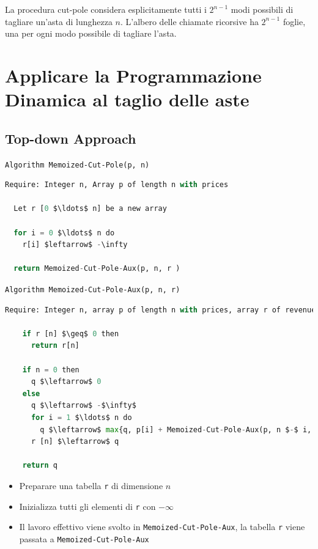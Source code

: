 La procedura cut-pole considera esplicitamente tutti i $2^{n-1}$ modi
possibili di tagliare un'asta di lunghezza $n$. L'albero delle
chiamate ricorsive ha $2^{n-1}$ foglie, una per ogni modo possibile di
tagliare l'asta.

\section{Applicare la Programmazione Dinamica al taglio delle aste}

\subsection{Top-down Approach}

\texttt{Algorithm Memoized-Cut-Pole(p, n)}\\

\begin{lstlisting}[language=Python, mathescape=true]
  Require: Integer n, Array p of length n with prices

  Let r [0 $\ldots$ n] be a new array
  
  for i = 0 $\ldots$ n do
    r[i] $leftarrow$ -\infty
  
  return Memoized-Cut-Pole-Aux(p, n, r )
  \end{lstlisting}

\texttt{Algorithm Memoized-Cut-Pole-Aux(p, n, r)}\\

\begin{lstlisting}[language=Python, mathescape=true]
    Require: Integer n, array p of length n with prices, array r of revenues

    if r [n] $\geq$ 0 then
      return r[n]
    
    if n = 0 then
      q $\leftarrow$ 0
    else
      q $\leftarrow$ -$\infty$
      for i = 1 $\ldots$ n do
        q $\leftarrow$ max{q, p[i] + Memoized-Cut-Pole-Aux(p, n $-$ i, r )}
      r [n] $\leftarrow$ q
    
    return q
    \end{lstlisting}

\begin{itemize}
  \item
        Preparare una tabella \texttt{r} di dimensione $n$
  \item
        Inizializza tutti gli elementi di \texttt{r} con $-\infty$
  \item
        Il lavoro effettivo viene svolto in \texttt{Memoized-Cut-Pole-Aux}, la
        tabella \texttt{r} viene passata a \texttt{Memoized-Cut-Pole-Aux}
\end{itemize}

